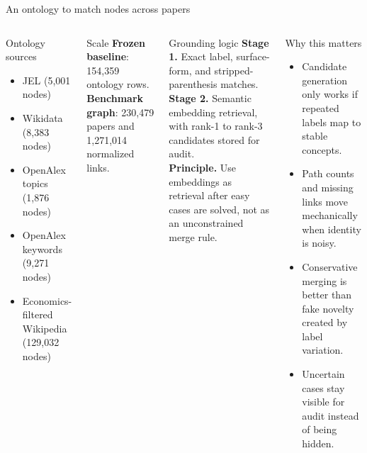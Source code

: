 \documentclass[aspectratio=169,10pt]{beamer}
\begin{document}
\begin{frame}{An ontology to match nodes across papers}
\begin{columns}[T,totalwidth=0.94\textwidth]
\begin{block}{Ontology sources}
{\scriptsize
\begin{itemize}
  \setlength{\itemsep}{0.1em}
  \item JEL (5,001 nodes)
  \item Wikidata (8,383 nodes)
  \item OpenAlex topics (1,876 nodes)
  \item OpenAlex keywords (9,271 nodes)
  \item Economics-filtered Wikipedia (129,032 nodes)
\end{itemize}
}
\end{block}

\vspace{0.2em}
\begin{block}{Scale}
{\scriptsize
\textbf{Frozen baseline}: 154,359 ontology rows.\\[0.2em]
\textbf{Benchmark graph}: 230,479 papers and 1,271,014 normalized links.
}
\end{block}

\begin{block}{Grounding logic}
{\scriptsize
\textbf{Stage 1.} Exact label, surface-form, and stripped-parenthesis matches.\\[0.25em]
\textbf{Stage 2.} Semantic embedding retrieval, with rank-1 to rank-3 candidates stored for audit.\\[0.25em]
\textbf{Principle.} Use embeddings as retrieval after easy cases are solved, not as an unconstrained merge rule.
}
\end{block}

\vspace{0.1em}
\begin{block}{Why this matters}
{\scriptsize
\begin{itemize}
  \setlength{\itemsep}{0.1em}
  \item Candidate generation only works if repeated labels map to stable concepts.
  \item Path counts and missing links move mechanically when identity is noisy.
  \item Conservative merging is better than fake novelty created by label variation.
  \item Uncertain cases stay visible for audit instead of being hidden.
\end{itemize}
}
\end{block}
\end{columns}
\end{frame}
\end{document}
